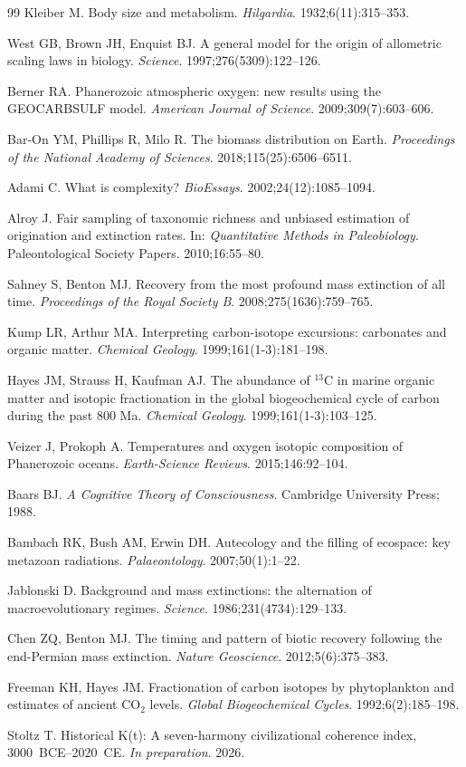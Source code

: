 \documentclass[10pt,letterpaper]{article}
\begin{document}
\begin{thebibliography}{99}
Kleiber M. Body size and metabolism.
\emph{Hilgardia}. 1932;6(11):315--353.

West GB, Brown JH, Enquist BJ. A general model for the origin of allometric scaling laws
in biology.
\emph{Science}. 1997;276(5309):122--126.

Berner RA. Phanerozoic atmospheric oxygen: new results using the GEOCARBSULF model.
\emph{American Journal of Science}. 2009;309(7):603--606.

Bar-On YM, Phillips R, Milo R. The biomass distribution on Earth.
\emph{Proceedings of the National Academy of Sciences}. 2018;115(25):6506--6511.

Adami C. What is complexity?
\emph{BioEssays}. 2002;24(12):1085--1094.

Alroy J. Fair sampling of taxonomic richness and unbiased estimation of origination
and extinction rates. In: \emph{Quantitative Methods in Paleobiology}.
Paleontological Society Papers. 2010;16:55--80.

Sahney S, Benton MJ. Recovery from the most profound mass extinction of all time.
\emph{Proceedings of the Royal Society B}. 2008;275(1636):759--765.

Kump LR, Arthur MA. Interpreting carbon-isotope excursions: carbonates and organic matter.
\emph{Chemical Geology}. 1999;161(1-3):181--198.

Hayes JM, Strauss H, Kaufman AJ. The abundance of $^{13}$C in marine organic matter and
isotopic fractionation in the global biogeochemical cycle of carbon during the past 800 Ma.
\emph{Chemical Geology}. 1999;161(1-3):103--125.

Veizer J, Prokoph A. Temperatures and oxygen isotopic composition of Phanerozoic oceans.
\emph{Earth-Science Reviews}. 2015;146:92--104.

Baars BJ. \emph{A Cognitive Theory of Consciousness}. Cambridge University Press; 1988.

Bambach RK, Bush AM, Erwin DH. Autecology and the filling of ecospace: key metazoan
radiations.
\emph{Palaeontology}. 2007;50(1):1--22.

Jablonski D. Background and mass extinctions: the alternation of macroevolutionary regimes.
\emph{Science}. 1986;231(4734):129--133.

Chen ZQ, Benton MJ. The timing and pattern of biotic recovery following the end-Permian
mass extinction.
\emph{Nature Geoscience}. 2012;5(6):375--383.

Freeman KH, Hayes JM. Fractionation of carbon isotopes by phytoplankton and estimates of
ancient CO$_2$ levels.
\emph{Global Biogeochemical Cycles}. 1992;6(2):185--198.

Stoltz T. Historical K(t): A seven-harmony civilizational coherence index, 3000~BCE--2020~CE.
\emph{In preparation}. 2026.

\end{thebibliography}
\end{document}
